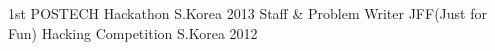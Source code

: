 \begin{cvhonors}
  \cvhonor
    {}
    {1st POSTECH Hackathon}
    {S.Korea}
    {2013}
  \cvhonor
    {Staff \& Problem Writer}
    {JFF(Just for Fun) Hacking Competition}
    {S.Korea}
    {2012}
\end{cvhonors}
